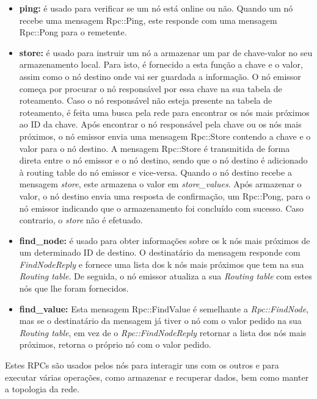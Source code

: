 \documentclass[conference]{IEEEtran}
\begin{document}
    \begin{itemize}
        \item \textbf{ping:} é usado para verificar se um nó está online ou não. Quando um nó recebe uma mensagem Rpc::Ping, este responde com uma mensagem Rpc::Pong para o remetente.
        \item \textbf{store:} é usado para instruir um nó a armazenar um par de chave-valor no seu armazenamento local. Para isto, é fornecido a esta função a chave e o valor, assim como o nó destino onde vai ser guardada a informação. O nó emissor começa por procurar o nó responsável por essa chave na sua tabela de roteamento. Caso o nó responsável não esteja presente na tabela de roteamento, é feita uma busca pela rede para encontrar os nós mais próximos ao ID da chave. Após encontrar o nó responsável pela chave ou os nós mais próximos, o nó emissor envia uma mensagem Rpc::Store contendo a chave e o valor para o nó destino. A mensagem Rpc::Store é transmitida de forma direta entre o nó emissor e o nó destino, sendo que o nó destino é adicionado à routing table do nó emissor e vice-versa. Quando o nó destino recebe a mensagem \textit{store}, este armazena o valor em \textit{store\_values}.
        Após armazenar o valor, o nó destino envia uma resposta de confirmação, um Rpc::Pong, para o nó emissor indicando que o armazenamento foi concluído com sucesso. Caso contrario, o \textit{store} não é efetuado.

        \item \textbf{find\_node:} é usado para obter informações sobre os k nós mais próximos de um determinado ID de destino. O destinatário da mensagem responde com \textit{FindNodeReply} e fornece uma lista dos k nós mais próximos que tem na sua \textit{Routing table}. De seguida, o nó emissor atualiza a sua \textit{Routing table} com estes nós que lhe foram fornecidos.

        \item \textbf{find\_value:} Esta mensagem Rpc::FindValue é semelhante a \textit{Rpc::FindNode}, mas se o destinatário da mensagem já tiver o nó com o valor pedido na sua \textit{Routing table}, em vez de o \textit{Rpc::FindNodeReply} retornar a lista dos nós mais próximos, retorna o próprio nó com o valor pedido.
    \end{itemize}
    Estes RPCs são usados pelos nós para interagir uns com os outros e para executar várias operações, como armazenar e recuperar dados, bem como manter a topologia da rede.
\end{document}
